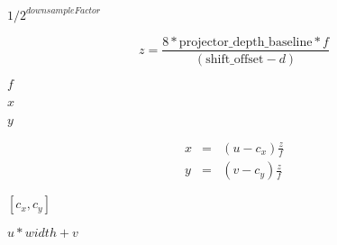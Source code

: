 \documentclass{article}
\begin{document}
$ 1/2^{downsampleFactor} $
\pagebreak

\[ z = \frac{8 * \mbox{projector\_depth\_baseline} * f}{(\mbox{shift\_offset} - d)} \]
\pagebreak

$f$
\pagebreak

$x$
\pagebreak

$y$
\pagebreak

\begin{eqnarray*} x &=& (u - c_x) \frac{z}{f} \\ y &=& (v - c_y) \frac{z}{f} \end{eqnarray*}
\pagebreak

$[c_x, c_y]$
\pagebreak

$ u * width + v $
\pagebreak
\end{document}
